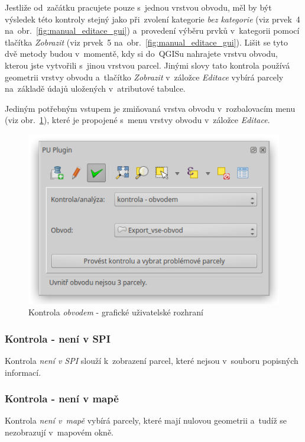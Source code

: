 Jestliže od~začátku pracujete pouze s~jednou vrstvou obvodu, měl by být výsledek této kontroly stejný jako při~zvolení kategorie \textit{bez kategorie} (viz prvek~4 na~obr.~\ref{fig:manual_editace_gui}) a~provedení výběru prvků v~kategorii pomocí tlačítka \textit{Zobrazit} (viz prvek~5 na~obr.~\ref{fig:manual_editace_gui}). Lišit se tyto dvě metody budou v~momentě, kdy si do~QGISu nahrajete vrstvu obvodu, kterou jste vytvořili s~jinou vrstvou parcel. Jinými slovy tato kontrola používá geometrii vrstvy obvodu a~tlačítko \textit{Zobrazit} v~záložce \textit{Editace} vybírá parcely na~základě údajů uložených v~atributové tabulce.

Jediným potřebným vstupem je zmiňovaná vrstva obvodu v~rozbalovacím menu (viz obr.~\ref{fig:manual_kontrola_obvodem_gui}), které je propojené s~menu vrstvy obvodu v~záložce \textit{Editace}.

	\begin{figure}[H]
		\centering
		\includegraphics[width=.55\textwidth]{./pictures/kontrola-obvodem.png}
		\caption[Kontrola \textit{obvodem} - grafické uživatelské rozhraní]{Kontrola \textit{obvodem} - grafické uživatelské rozhraní}
		\label{fig:manual_kontrola_obvodem_gui}
 	\end{figure}

\subsubsection{Kontrola - není v SPI}
\label{manual_kontrola_neni_v_spi}

Kontrola \textit{není v SPI} slouží k~zobrazení parcel, které nejsou v~souboru popisných informací.

\subsubsection{Kontrola - není v mapě}
\label{manual_kontrola_neni_v_mape}

Kontrola \textit{není v~mapě} vybírá parcely, které mají nulovou geometrii a~tudíž se nezobrazují v~mapovém okně.

